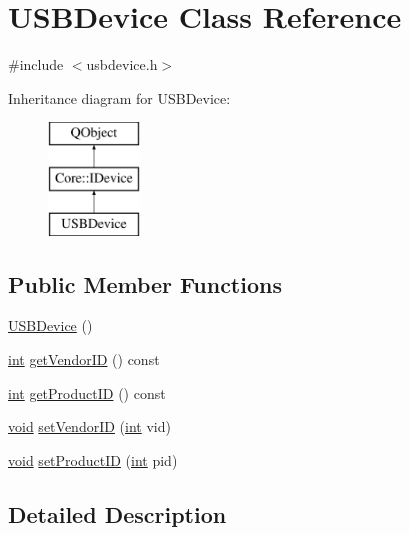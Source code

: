 \hypertarget{class_u_s_b_device}{\section{U\-S\-B\-Device Class Reference}
\label{class_u_s_b_device}
}


{\ttfamily \#include $<$usbdevice.\-h$>$}

Inheritance diagram for U\-S\-B\-Device\-:\begin{figure}[H]
\begin{center}
\leavevmode
\includegraphics[height=3.000000cm]{class_u_s_b_device}
\end{center}
\end{figure}
\subsection*{Public Member Functions}
\begin{DoxyCompactItemize}
\item 
\hyperlink{group___core_plugin_ga93edec0ee7cca3212ec8553fc8cc51cc}{U\-S\-B\-Device} ()
\item 
\hyperlink{ioapi_8h_a787fa3cf048117ba7123753c1e74fcd6}{int} \hyperlink{group___core_plugin_ga292a0c79309ca19602eb3a3538ae23b2}{get\-Vendor\-I\-D} () const 
\item 
\hyperlink{ioapi_8h_a787fa3cf048117ba7123753c1e74fcd6}{int} \hyperlink{group___core_plugin_ga82accd0aa6340a4f0b62112a4d4167f6}{get\-Product\-I\-D} () const 
\item 
\hyperlink{group___u_a_v_objects_plugin_ga444cf2ff3f0ecbe028adce838d373f5c}{void} \hyperlink{group___core_plugin_ga2380f14d6b9cdc20421d32b660881955}{set\-Vendor\-I\-D} (\hyperlink{ioapi_8h_a787fa3cf048117ba7123753c1e74fcd6}{int} vid)
\item 
\hyperlink{group___u_a_v_objects_plugin_ga444cf2ff3f0ecbe028adce838d373f5c}{void} \hyperlink{group___core_plugin_ga62cc5d3c3c0fe1d81d61ce2f7d5c24be}{set\-Product\-I\-D} (\hyperlink{ioapi_8h_a787fa3cf048117ba7123753c1e74fcd6}{int} pid)
\end{DoxyCompactItemize}


\subsection{Detailed Description}


